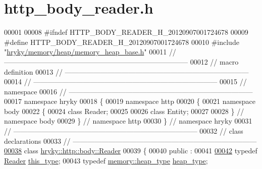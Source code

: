 \hypertarget{http__body__reader_8h_source}{\section{http\-\_\-body\-\_\-reader.\-h}
}

\begin{DoxyCode}
00001 
00008 \textcolor{preprocessor}{#ifndef HTTP\_BODY\_READER\_H\_20120907001724678}
00009 \textcolor{preprocessor}{}\textcolor{preprocessor}{#define HTTP\_BODY\_READER\_H\_20120907001724678}
00010 \textcolor{preprocessor}{}\textcolor{preprocessor}{#include "\hyperlink{memory__heap__base_8h}{hryky/memory/heap/memory_heap_base.h}"}
00011 \textcolor{comment}{//
      ------------------------------------------------------------------------------}
00012 \textcolor{comment}{// macro definition}
00013 \textcolor{comment}{//
      ------------------------------------------------------------------------------}
00014 \textcolor{comment}{//
      ------------------------------------------------------------------------------}
00015 \textcolor{comment}{// namespace}
00016 \textcolor{comment}{//
      ------------------------------------------------------------------------------}
00017 \textcolor{keyword}{namespace }hryky
00018 \{
00019 \textcolor{keyword}{namespace }http
00020 \{
00021 \textcolor{keyword}{namespace }body
00022 \{
00024     \textcolor{keyword}{class }Reader;
00025 
00026     \textcolor{keyword}{class }Entity;
00027 
00028 \} \textcolor{comment}{// namespace body}
00029 \} \textcolor{comment}{// namespace http}
00030 \} \textcolor{comment}{// namespace hryky}
00031 \textcolor{comment}{//
      ------------------------------------------------------------------------------}
00032 \textcolor{comment}{// class declarations}
00033 \textcolor{comment}{//
      ------------------------------------------------------------------------------}
\hypertarget{http__body__reader_8h_source_l00038}{}\hyperlink{classhryky_1_1http_1_1body_1_1_reader}{00038} \textcolor{comment}{}\textcolor{keyword}{class }\hyperlink{classhryky_1_1http_1_1body_1_1_reader}{hryky::http::body::Reader}
00039 \{
00040 \textcolor{keyword}{public} :
00041 
\hypertarget{http__body__reader_8h_source_l00042}{}\hyperlink{classhryky_1_1http_1_1body_1_1_reader_ab81eae48a1c2e78cf613bffd7180400c}{00042}     \textcolor{keyword}{typedef} \hyperlink{classhryky_1_1http_1_1body_1_1_reader}{Reader} \hyperlink{classhryky_1_1http_1_1body_1_1_reader_ab81eae48a1c2e78cf613bffd7180400c}{this_type};
00043     \textcolor{keyword}{typedef} \hyperlink{classhryky_1_1memory_1_1heap_1_1_base}{memory::heap_type} \hyperlink{classhryky_1_1memory_1_1heap_1_1_base}{heap_type};

\end{DoxyCode}
